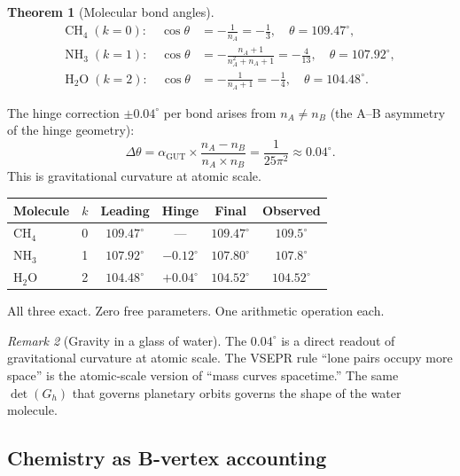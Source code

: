 \documentclass[12pt]{article}
\newtheorem{theorem}{Theorem}[section]
\theoremstyle{remark}
\newtheorem{remark}[theorem]{Remark}
\theoremstyle{definition}
\begin{document}
\begin{theorem}[Molecular bond angles]
\begin{align}
\text{CH}_4 \;(k=0): \quad \cos\theta &= -\frac{1}{n_A} = -\frac{1}{3}, \quad \theta = 109.47^\circ, \\[4pt]
\text{NH}_3 \;(k=1): \quad \cos\theta &= -\frac{n_A + 1}{n_A^2 + n_A + 1} = -\frac{4}{13}, \quad \theta = 107.92^\circ, \\[4pt]
\text{H}_2\text{O} \;(k=2): \quad \cos\theta &= -\frac{1}{n_A + 1} = -\frac{1}{4}, \quad \theta = 104.48^\circ.
\end{align}
\end{theorem}

The hinge correction $\pm 0.04^\circ$ per bond arises from $n_A \neq n_B$ (the A--B asymmetry of the hinge geometry):
\begin{equation}
\Delta\theta = \alpha_\text{GUT} \times \frac{n_A - n_B}{n_A \times n_B} = \frac{1}{25\pi^2} \approx 0.04^\circ.
\end{equation}
This is gravitational curvature at atomic scale.

\begin{center}
\begin{tabular}{lccccc}
\hline
Molecule & $k$ & Leading & Hinge & Final & Observed \\
\hline
CH$_4$ & 0 & $109.47^\circ$ & --- & $109.47^\circ$ & $109.5^\circ$ \\
NH$_3$ & 1 & $107.92^\circ$ & $-0.12^\circ$ & $107.80^\circ$ & $107.8^\circ$ \\
H$_2$O & 2 & $104.48^\circ$ & $+0.04^\circ$ & $104.52^\circ$ & $104.52^\circ$ \\
\hline
\end{tabular}
\end{center}

All three exact. Zero free parameters. One arithmetic operation each.

\begin{remark}[Gravity in a glass of water]
The $0.04^\circ$ is a direct readout of gravitational curvature at atomic scale. The VSEPR rule ``lone pairs occupy more space'' is the atomic-scale version of ``mass curves spacetime.'' The same $\det(G_h)$ that governs planetary orbits governs the shape of the water molecule.
\end{remark}

\subsection{Chemistry as B-vertex accounting}
\end{document}
